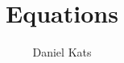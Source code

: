 \documentclass[a4paper,floatfix,11pt]{article}
\providecommand{\QuantwoInputFileName}{input}%
\begin{document}
\author{Daniel Kats}

\title{Equations}

\maketitle




\bigskip
\end{document}
